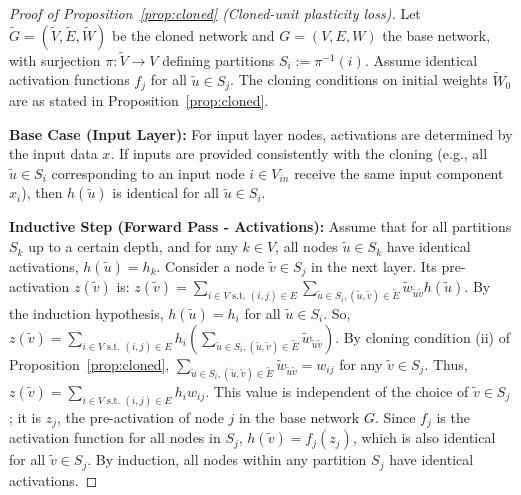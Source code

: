 \documentclass{article}
\begin{document}
\begin{proof}[Proof of Proposition~\ref{prop:cloned} (Cloned-unit plasticity loss)]
Let $\widetilde{G}=(\widetilde{V},\widetilde{E},\widetilde{W})$ be the cloned network and $G=(V,E,W)$ the base network, with surjection $\pi:\widetilde{V}\to V$ defining partitions $S_i:=\pi^{-1}(i)$. Assume identical activation functions $f_j$ for all $\widetilde{u} \in S_j$. The cloning conditions on initial weights $\widetilde{W}_0$ are as stated in Proposition~\ref{prop:cloned}.

\textbf{Base Case (Input Layer):} For input layer nodes, activations are determined by the input data $x$. If inputs are provided consistently with the cloning (e.g., all $\widetilde{u} \in S_i$ corresponding to an input node $i \in V_{in}$ receive the same input component $x_i$), then $h(\widetilde{u})$ is identical for all $\widetilde{u} \in S_i$.

\textbf{Inductive Step (Forward Pass - Activations):} Assume that for all partitions $S_k$ up to a certain depth, and for any $k \in V$, all nodes $\widetilde{u} \in S_k$ have identical activations, $h(\widetilde{u}) = h_k$.
Consider a node $\widetilde{v} \in S_j$ in the next layer. Its pre-activation $z(\widetilde{v})$ is:
$z(\widetilde{v}) = \sum_{i \in V \text{ s.t. } (i,j) \in E} \sum_{\widetilde{u} \in S_i, (\widetilde{u},\widetilde{v}) \in \widetilde{E}} \widetilde{w}_{\widetilde{u}\widetilde{v}} h(\widetilde{u})$.
By the induction hypothesis, $h(\widetilde{u}) = h_i$ for all $\widetilde{u} \in S_i$. So,
$z(\widetilde{v}) = \sum_{i \in V \text{ s.t. } (i,j) \in E} h_i \left( \sum_{\widetilde{u} \in S_i, (\widetilde{u},\widetilde{v}) \in \widetilde{E}} \widetilde{w}_{\widetilde{u}\widetilde{v}} \right)$.
By cloning condition (ii) of Proposition~\ref{prop:cloned}, $\sum_{\widetilde{u} \in S_i, (\widetilde{u},\widetilde{v}) \in \widetilde{E}} \widetilde{w}_{\widetilde{u}\widetilde{v}} = w_{ij}$ for any $\widetilde{v} \in S_j$.
Thus, $z(\widetilde{v}) = \sum_{i \in V \text{ s.t. } (i,j) \in E} h_i w_{ij}$. This value is independent of the choice of $\widetilde{v} \in S_j$; it is $z_j$, the pre-activation of node $j$ in the base network $G$.
Since $f_j$ is the activation function for all nodes in $S_j$, $h(\widetilde{v}) = f_j(z_j)$, which is also identical for all $\widetilde{v} \in S_j$.
By induction, all nodes within any partition $S_j$ have identical activations.


\end{proof}
\end{document}
